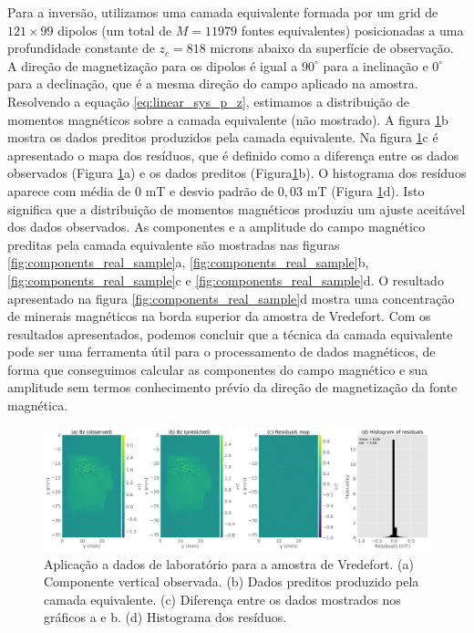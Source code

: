 Para a inversão, utilizamos uma camada equivalente formada por um grid de $121 \times 99$ dipolos (um total de $M=11979$ fontes equivalentes) posicionadas a uma profundidade constante de $z_c = 818$ microns abaixo da superfície de observação. A direção de magnetização para os dipolos é igual a $90^\circ$ para a inclinação e $0^\circ$ para a declinação, que é a mesma direção do campo aplicado na amostra. Resolvendo a equação \ref{eq:linear_sys_p_z}, estimamos a distribuição de momentos magnéticos sobre a camada equivalente (não mostrado). A figura \ref{fig:datafit_real_sample}b mostra os dados preditos produzidos pela camada equivalente. Na figura \ref{fig:datafit_real_sample}c é apresentado o mapa dos resíduos, que é definido como a diferença entre os dados observados (Figura \ref{fig:datafit_real_sample}a) e os dados preditos (Figura\ref{fig:datafit_real_sample}b). O histograma dos resíduos aparece com média de $0$ mT e desvio padrão de $0,03$ mT (Figura \ref{fig:datafit_real_sample}d). Isto significa que a distribuição de momentos magnéticos produziu um ajuste aceitável dos dados observados. As componentes e a amplitude do campo magnético preditas pela camada equivalente são mostradas nas figuras \ref{fig:components_real_sample}a, \ref{fig:components_real_sample}b, \ref{fig:components_real_sample}c e \ref{fig:components_real_sample}d. O resultado apresentado na figura \ref{fig:components_real_sample}d mostra uma concentração de minerais magnéticos na borda superior da amostra de Vredefort. Com os resultados apresentados, podemos concluir que a técnica da camada equivalente pode ser uma ferramenta útil para o processamento de dados magnéticos, de forma que conseguimos calcular as componentes do campo magnético e sua amplitude sem termos conhecimento prévio da direção de magnetização da fonte magnética. 

\begin{figure}
	\centering
	\includegraphics[width=.9\textwidth]{Fig/mag_vec/aplicacao_vredefort/results_data_fitting_Bz.png}
	\caption{Aplicação a dados de laboratório para a amostra de Vredefort. (a) Componente vertical observada. (b) Dados preditos produzido pela camada equivalente. (c) Diferença entre os dados mostrados nos gráficos a e b. (d) Histograma dos resíduos.}
	\label{fig:datafit_real_sample}
\end{figure}

